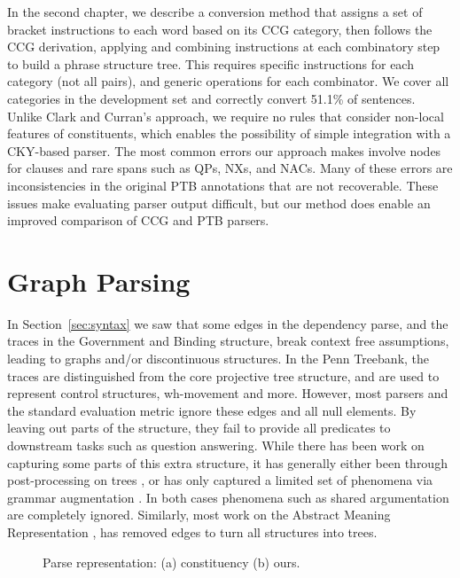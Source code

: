 In the second chapter, we describe a conversion method that assigns a set of bracket instructions to each word based on its CCG category, then follows the CCG derivation, applying and combining instructions at each combinatory step to build a phrase structure tree.
This requires specific instructions for each category (not all pairs), and generic operations for each combinator.
We cover all categories in the development set and correctly convert 51.1\% of sentences.
Unlike Clark and Curran's approach, we require no rules that consider non-local features of constituents, which enables the possibility of simple integration with a CKY-based parser.
The most common errors our approach makes involve nodes for clauses and rare spans such as QPs, NXs, and NACs.
Many of these errors are inconsistencies in the original PTB annotations that are not recoverable.
These issues make evaluating parser output difficult, but our method does enable an improved comparison of CCG and PTB parsers.

\section{Graph Parsing}

In Section~\ref{sec:syntax} we saw that some edges in the dependency parse, and the traces in the Government and Binding structure, break context free assumptions, leading to graphs and/or discontinuous structures.
In the Penn Treebank, the traces are distinguished from the core projective tree structure, and are used to represent control structures, wh-movement and more.
However, most parsers and the standard evaluation metric ignore these edges and all null elements.
By leaving out parts of the structure, they fail to provide all predicates to downstream tasks such as question answering.
While there has been work on capturing some parts of this extra structure, it has generally either been through post-processing on trees \parencite{Johnson:2002,Jijkoun:2003,Campbell:2004,Levy:2004,Gabbard:2006}, or has only captured a limited set of phenomena via grammar augmentation \parencite{collins:1997,dienes-dubey:2003,schmid:2006,cai-chiang-goldberg:2011}.
In both cases phenomena such as shared argumentation are completely ignored.
Similarly, most work on the Abstract Meaning Representation \parencite{amr}, has removed edges to turn all structures into trees.

\begin{figure}
  \centering
  \scalebox{1.0}{
    
  }
  \caption{\label{fig:repr}
    Parse representation: (a) constituency (b) ours.
  }
\end{figure}

